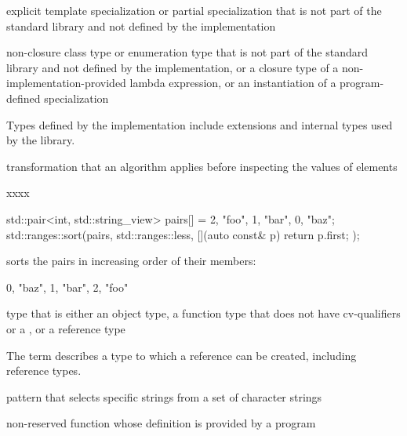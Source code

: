 %
explicit template specialization or partial specialization
that is not part of the \Cpp{} standard library and
not defined by the implementation

%
non-closure class type or enumeration type
that is not part of the \Cpp{} standard library and
not defined by the implementation,
or a closure type of a non-implementation-provided lambda expression,
or an instantiation of a program-defined specialization

\begin{defnote}
Types defined by the implementation include
extensions and internal types used by the library.
\end{defnote}

%
transformation that an algorithm applies
before inspecting the values of elements

\begin{example}  xxxx
  \begin{codeblock}
std::pair<int, std::string_view> pairs[] = {{2, "foo"}, {1, "bar"}, {0, "baz"}};
std::ranges::sort(pairs, std::ranges::less{}, [](auto const& p) { return p.first; });
\end{codeblock}
sorts the pairs in increasing order of their  members:
\begin{codeblock}
{{0, "baz"}, {1, "bar"}, {2, "foo"}}
\end{codeblock}
\end{example}

%
type that is either an
object type, a function type that does not have cv-qualifiers or a
, or a reference type

\begin{defnote}
The term describes a type to which a reference can be created,
including reference types.
\end{defnote}

pattern that selects specific strings
from a set of character strings

%
non-reserved function
whose definition is provided by a \Cpp{} program

